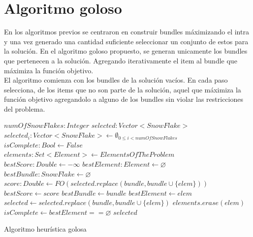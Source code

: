 \section{Algoritmo goloso}
En los algoritmos previos se centraron en construir bundles máximizando el intra y una vez generado 
una cantidad suficiente seleccionar un conjunto de estos para la solución.
En el algoritmo goloso propuesto, se generan unicamente los bundles que pertenecen a la solución.
Agregando iterativamente el item al bundle que máximiza la función objetivo.\\
El algoritmo comienza con los bundles de la solución vacíos. En cada paso selecciona, de los items que no son parte
de la solución, aquel que máximiza la función objetivo agregandolo a alguno de los bundles sin violar las restricciones
del problema.
\begin{algorithm}[H]
\begin{algorithmic}[1]
\REQUIRE $numOfSnowFlakes:Integer$
\ENSURE $selected:Vector<SnowFlake>$
\STATE $selected_{i}:Vector<SnowFlake> \leftarrow \emptyset_{0\leq i<numOfSnowFlakes}$
\STATE $isComplete:Bool \leftarrow False$
\STATE $elements:Set<Element> \leftarrow ElementsOfTheProblem$
  \STATE $bestScore:Double \leftarrow -\infty$
  \STATE $bestElement:Element \leftarrow \varnothing$
  \STATE $bestBundle:SnowFlake \leftarrow \varnothing$
        \STATE $score:Double \leftarrow FO(selected.replace(bundle, bundle \cup \{elem\}))$
          \STATE $bestScore \leftarrow score$
          \STATE $bestBundle \leftarrow bundle$
          \STATE $bestElement \leftarrow elem$
        \ENDIF
      \ENDIF
    \ENDFOR
  \ENDFOR
  \STATE $selected \leftarrow selected.replace(bundle, bundle \cup \{elem\})$
  \STATE $elements.erase(elem)$
  \STATE $isComplete \leftarrow bestElement == \varnothing$
\ENDWHILE
\RETURN $selected$
\end{algorithmic}
\caption{Algoritmo heurística golosa}\label{alg:algHeuGol}
\end{algorithm}

